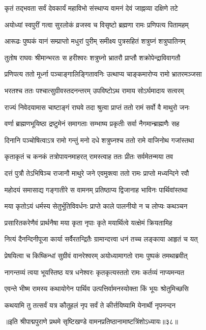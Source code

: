 \twolineshloka
{कृतं तद्भवता सर्वं देवकार्यं महाविभो}
{संस्थाप्य वामनं देवं जाह्नव्या दक्षिणे तटे}%

\twolineshloka
{अयोध्यां स्वपुरीं गत्वा सुरलोकं व्रजस्व च}
{विसृष्टो ब्रह्मणा रामः प्रणिपत्य पितामहम्}%

\twolineshloka
{आरूढः पुष्पकं यानं सम्प्राप्तो मधुरां पुरीम्}
{समीक्ष्य पुत्रसहितं शत्रुघ्नं शत्रुघातिनम्}%

\twolineshloka
{तुतोष राघवः श्रीमान्भरतः स हरीश्वरः}
{शत्रुघ्नो भ्रातरौ प्राप्तौ शक्रोपेन्द्राविवागतौ}%

\twolineshloka
{प्रणिपत्य ततो मूर्ध्ना पञ्चाङ्गालिङ्गितावनिः}
{उत्थाप्य चाङ्कमारोप्य रामो भ्रातरमञ्जसा}%

\twolineshloka
{भरतश्च ततः पश्चात्सुग्रीवस्तदनन्तरम्}
{उपविष्टोऽथ रामाय सोऽर्घमादाय सत्वरम्}%

\twolineshloka
{राज्यं निवेदयामास चाष्टाङ्गं राघवे तदा}
{श्रुत्वा प्राप्तं ततो रामं सर्वो वै माथुरो जनः}%

\twolineshloka
{वर्णा ब्राह्मणभूयिष्ठा द्रष्टुमेनं समागताः}
{सम्भाष्य प्रकृतीः सर्वा नैगमान्ब्राह्मणैः सह}%

\twolineshloka
{दिनानि पञ्चोषित्वाऽत्र रामो गन्तुं मनो दधे}
{शत्रुघ्नश्च ततो रामे वाजिनोथ गजांस्तथा}%

\twolineshloka
{कृताकृतं च कनकं तत्रोपायनमाहरत्}
{रामस्त्वाह ततः प्रीतः सर्वमेतन्मया तव}%

\twolineshloka
{दत्तं पुत्रौ तेऽभिषिञ्च राजानौ माथुरे जने}
{एवमुक्त्वा ततो रामः प्राप्तो मध्यन्दिने रवौ}%

\twolineshloka
{महोदयं समासाद्य गङ्गातीरे स वामनम्}
{प्रतिष्ठाप्य द्विजानाह भाविनः पार्थिवांस्तथा}%

\twolineshloka
{मया कृतोऽयं धर्मस्य सेतुर्भूतिविवर्धनः}
{प्राप्ते काले पालनीयो न च लोप्यः कथञ्चन}%

\twolineshloka
{प्रसारितकरेणैवं प्रार्थनैषा मया कृता}
{नृपाः कृते मयार्थित्वे यत्क्षेमं क्रियतामिह}%

\twolineshloka
{नित्यं दैनन्दिनीपूजा कार्या सर्वैरतन्द्रितैः}
{ग्रामान्दत्त्वा धनं तच्च लङ्काया आहृतं च यत्}%

\twolineshloka
{प्रेषयित्वा च किष्किन्धां सुग्रीवं वानरेश्वरम्}
{अयोध्यामागतो रामः पुष्पकं तमथाब्रवीत्}%

\twolineshloka
{नागन्तव्यं त्वया भूयस्तिष्ठ यत्र धनेश्वरः}
{कृतकृत्यस्ततो रामः कर्तव्यं नाप्यमन्यत}%


\twolineshloka
{एवन्ते भीष्म रामस्य कथायोगेन पार्थिव}
{उत्पत्तिर्वामनस्योक्ता किं भूयः श्रोतुमिच्छसि}%

\twolineshloka
{कथयामि तु तत्सर्वं यत्र कौतूहलं नृप}
{सर्वं ते कीर्त्तयिष्यामि येनार्थी नृपनन्दन}%

{॥इति श्रीपाद्मपुराणे प्रथमे सृष्टिखण्डे वामनप्रतिष्ठानामाष्टत्रिंशोऽध्यायः॥३८॥}

